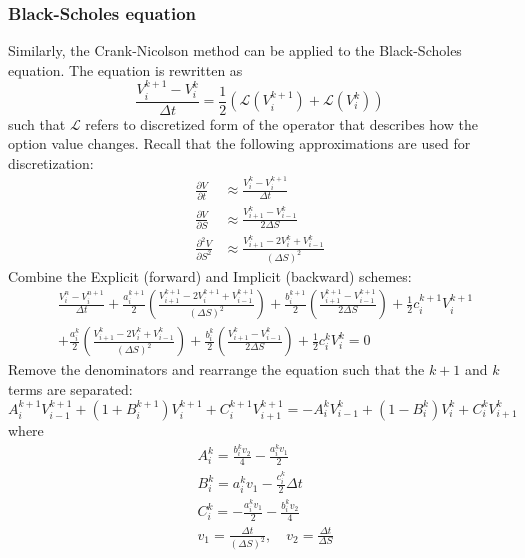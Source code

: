 \subsubsection{Black-Scholes equation}
Similarly, the Crank-Nicolson method can be applied to the Black-Scholes equation. The equation is rewritten as 
\begin{equation}
    \frac{V_i^{k+1} - V_i^k}{\Delta t} = \frac{1}{2} \left( \mathcal{L}(V_i^{k+1}) + \mathcal{L}(V_i^k) \right)
\end{equation}
such that $\mathcal{L}$ refers to discretized form of the operator that describes how the option value changes. Recall that the following approximations are used for discretization:
\begin{align}
    \frac{\partial V}{\partial t} &\approx \frac{V_i^k - V_i^{k+1}}{\Delta t} \tag{Theta} \\
    \frac{\partial V}{\partial S} &\approx \frac{V_{i+1}^k - V_{i-1}^k}{2 \Delta S} \tag{Delta} \\
    \frac{\partial^2 V}{\partial S^2} &\approx \frac{V_{i+1}^k - 2V_i^k + V_{i-1}^k}{(\Delta S)^2} \tag{Gamma}
 \end{align}
Combine the Explicit (forward) and Implicit (backward) schemes: 
\[
\begin{aligned}
    &\frac{V_i^n - V_i^{n+1}}{\Delta t} + \frac{a_i^{k+1}}{2} \left( \frac{V_{i+1}^{k+1} - 2 V_i^{k+1} + V_{i-1}^{k+1}}{(\Delta S)^2} \right) + \frac{b_i^{k+1}}{2} \left( \frac{V_{i+1}^{k+1} - V_{i-1}^{k+1}}{2 \Delta S} \right) + \frac{1}{2} c_i^{k+1} V_i^{k+1} \\
    &+ \frac{a_i^{k}}{2} \left( \frac{V_{i+1}^{k} - 2 V_i^{k} + V_{i-1}^{k}}{(\Delta S)^2} \right) + \frac{b_i^{k}}{2} \left( \frac{V_{i+1}^{k} - V_{i-1}^{k}}{2 \Delta S} \right) + \frac{1}{2} c_i^{k} V_i^{k} = 0
\end{aligned}
\]
Remove the denominators and rearrange the equation such that the $k+1$ and $k$ terms are separated:
\[
    A_i^{k+1} V_{i-1}^{k+1} + (1+B_i^{k+1})V_i^{k+1} + C_i^{k+1} V_{i+1}^{k+1} = -A_i^k V_{i-1}^{k} + (1-B_i^{k})V_i^{k} + C_i^{k} V_{i+1}^k
\]
where
\begin{align*}
    &A_i^k = \frac{b_i^k v_2}{4} - \frac{a_i^k v_1}{2} \\
    &B_i^k = a_i^k v_1 - \frac{c_i^k}{2} \Delta t \\
    &C_i^k = - \frac{a_i^k v_1}{2} -\frac{b_i^k v_2}{4} \\
    &v_1 = \frac{\Delta t}{(\Delta S)^2}, \quad v_2 = \frac{\Delta t}{\Delta S}
\end{align*}


